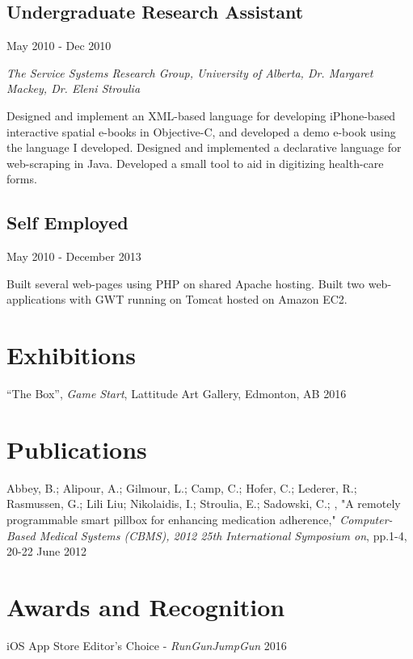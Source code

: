 \documentclass[10pt]{article}
\begin{document}
\subsection*{Undergraduate Research Assistant}
May 2010 - Dec 2010

\emph{The Service Systems Research Group, University of Alberta, Dr. Margaret Mackey, Dr. Eleni Stroulia}
\vspace{\baselineskip}

Designed and implement an XML-based language for developing iPhone-based interactive spatial e-books in Objective-C, and developed a demo e-book using the language I developed. Designed and implemented a declarative language for web-scraping in Java. Developed a small tool to aid in digitizing health-care forms.



\subsection*{Self Employed}
May 2010 - December 2013
\vspace{\baselineskip}

Built several web-pages using PHP on shared Apache hosting. Built two web-applications with GWT running on Tomcat hosted on Amazon EC2.

\section*{Exhibitions}
``The Box'', \emph{Game Start}, Lattitude Art Gallery, Edmonton, AB \hfill 2016 \\
\section*{Publications}
Abbey, B.; Alipour, A.; Gilmour, L.; Camp, C.; Hofer, C.; Lederer, R.; Rasmussen, G.; Lili Liu; Nikolaidis, I.; Stroulia, E.; Sadowski, C.; , "A remotely programmable smart pillbox for enhancing medication adherence," \emph{Computer-Based Medical Systems (CBMS), 2012 25th International Symposium on}, pp.1-4, 20-22 June 2012

\section*{Awards and Recognition}

\noindent iOS App Store Editor's Choice - \emph{RunGunJumpGun} \hfill 2016 \\
\end{document}
